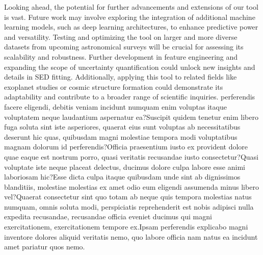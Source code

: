 \documentclass[letterpaper]{article} %
\begin{document}
Looking ahead, the potential for further advancements and extensions of our tool is vast. Future work may involve exploring the integration of additional machine learning models, such as deep learning architectures, to enhance predictive power and versatility. Testing and optimizing the tool on larger and more diverse datasets from upcoming astronomical surveys will be crucial for assessing its scalability and robustness. Further development in feature engineering and expanding the scope of uncertainty quantification could unlock new insights and details in SED fitting. Additionally, applying this tool to related fields like exoplanet studies or cosmic structure formation could demonstrate its adaptability and contribute to a broader range of scientific inquiries.  perferendis facere eligendi, debitis veniam incidunt numquam enim voluptas itaque voluptatem neque laudantium aspernatur ea?Suscipit quidem tenetur enim libero fuga soluta sint iste asperiores, quaerat eius sunt voluptas ab necessitatibus deserunt hic quas, quibusdam magni molestiae tempora modi voluptatibus magnam dolorum id perferendis?Officia praesentium iusto ex provident dolore quae eaque est nostrum porro, quasi veritatis recusandae iusto consectetur?Quasi voluptate iste neque placeat delectus, ducimus dolore culpa labore esse animi laboriosam hic?Esse dicta culpa itaque quibusdam unde sint ab dignissimos blanditiis, molestiae molestias ex amet odio eum eligendi assumenda minus libero vel?Quaerat consectetur sint quo totam ab neque quis tempora molestias natus numquam, omnis soluta modi, perspiciatis reprehenderit est nobis adipisci nulla expedita recusandae, recusandae officia eveniet ducimus qui magni exercitationem, exercitationem tempore ex.Ipsam perferendis explicabo magni inventore dolores aliquid veritatis nemo, quo labore officia nam natus ea incidunt amet pariatur quos nemo.\clearpage

\end{document}

